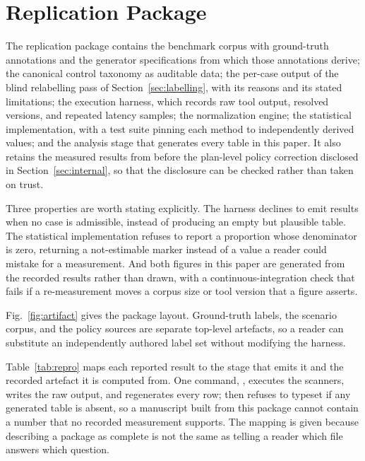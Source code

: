 \documentclass[smallextended]{svjour3}
\begin{document}
\section{Replication Package}
\label{sec:replication}

The replication package contains the benchmark corpus with ground-truth
annotations and the generator specifications from which those annotations derive;
the canonical control taxonomy as auditable data; the per-case output of the blind
relabelling pass of Section~\ref{sec:labelling}, with its reasons and its stated
limitations; the execution harness, which records raw tool output, resolved
versions, and repeated latency samples; the normalization engine; the statistical
implementation, with a test suite pinning each method to independently derived
values; and the analysis stage that generates every table in this paper. It also
retains the measured results from before the plan-level policy correction
disclosed in Section~\ref{sec:internal}, so that the disclosure can be checked
rather than taken on trust.

Three properties are worth stating explicitly. The harness declines to emit
results when no case is admissible, instead of producing an empty but plausible
table. The statistical implementation refuses to report a proportion whose
denominator is zero, returning a not-estimable marker instead of a value a reader
could mistake for a measurement. And both figures in this paper are generated
from the recorded results rather than drawn, with a continuous-integration check
that fails if a re-measurement moves a corpus size or tool version that a figure
asserts.

Fig.~\ref{fig:artifact} gives the package layout. Ground-truth labels, the
scenario corpus, and the policy sources are separate top-level artefacts, so a
reader can substitute an independently authored label set without modifying the
harness.

Table~\ref{tab:repro} maps each reported result to the stage that emits it and the
recorded artefact it is computed from. One command,
, executes the scanners, writes the raw output,
and regenerates every row;  then refuses to typeset if any
generated table is absent, so a manuscript built from this package cannot contain a
number that no recorded measurement supports. The mapping is given because
describing a package as complete is not the same as telling a reader which file
answers which question.
\end{document}
